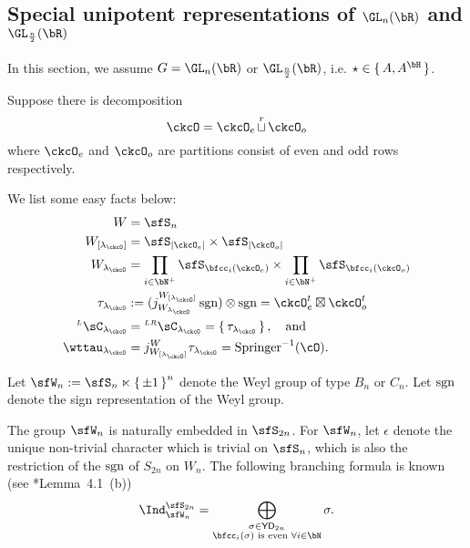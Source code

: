 \documentclass[counting_main.tex]{subfiles}
\begin{document}
\subsection{Special unipotent representations of $\GL_n(\bR)$ and
  $\GL_{\frac{n}{2}}(\bR)$}
In this section, we assume $G = \GL_{n}(\bR)$ or $\GL_{\frac{n}{2}}(\bR)$, i.e.
$\star\in \set{A,A^{\bH}}$.


Suppose there is decomposition %
\[
  \ckcO = \ckcO_{e} \cuprow \ckcO_{o}
\]
where $\ckcO_e$ and $\ckcO_o$ are partitions consist of even and odd rows
respectively.

We list some easy facts below:
\[
  \begin{split}
    W &= \sfS_{n} \\
    W_{[\lamck]} & = \sfS_{\abs{\ckcO_{e}}}\times \sfS_{\abs{\ckcO_{o}}} \\
    W_{\lamck} & = \prod_{i\in \bN^{+}}\sfS_{\bfcc_{i}(\ckcO_{e})}\times \prod_{i\in \bN^{+}}\sfS_{\bfcc_{i}(\ckcO_{o})}\\\
    \tau_{\lamck} & := (j_{W_{\lamck}}^{W_{[\lamck]}}\sgn )\otimes \sgn =  \ckcO_{e}^{t}\boxtimes \ckcO_{o}^{t}\\
    \LC_{\lamck} & = \LRC_{\lamck}= \set{\tau_{\lamck}}, \AND \\
    \wttau_{\lamck} & = j_{W_{[\lamck]}}^{W}\tau_{\lamck} = \Spr^{-1}(\cO).
  \end{split}
\]










Let $\sfW_n := \sfS_n \ltimes \set{\pm 1}^n$ denote the Weyl group of type $B_n$
or $C_n$. Let $\operatorname{sgn}$ denote the sign representation of the Weyl group.

The group $\sfW_n$ is naturally embedded in $\sfS_{2n}$. For $\sfW_n$, let
$\epsilon$ denote the unique non-trivial character which is trivial on $\sfS_n$,
which is also the restriction of the $\operatorname{sgn}$ of $S_{2n}$ on $W_n$. The following
branching formula is known (see \cite{BV.W}*{Lemma~4.1~(b)})
\begin{equation}
  \Ind_{\sfW_{n}}^{\sfS_{2n}} = \bigoplus_{\substack{\sigma\in \YD_{2n}\\
      \bfcc_{i}(\sigma) \text{ is even } \forall i\in \bN}} \sigma.
\end{equation}
\end{document}
